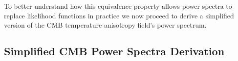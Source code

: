 To better understand how this equivalence property allows power spectra to replace likelihood functions in practice we now proceed to derive a simplified version of the CMB temperature anisotropy field's power spectrum.

\subsection{Simplified CMB Power Spectra Derivation}\label{subsec:simplified_cmb_power_spectra}



